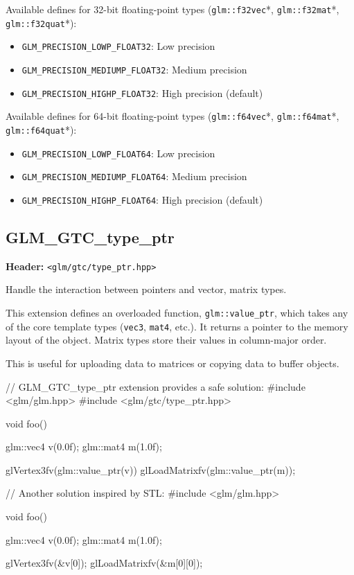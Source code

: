 \documentclass{scrartcl}
\numberwithin{figure}{subsection}
\begin{document}
Available defines for 32-bit floating-point types (\verb|glm::f32vec|*, \verb|glm::f32mat|*, \verb|glm::f32quat|*):

\begin{itemize}
    \item \verb|GLM_PRECISION_LOWP_FLOAT32|: Low precision
    \item \verb|GLM_PRECISION_MEDIUMP_FLOAT32|: Medium precision
    \item \verb|GLM_PRECISION_HIGHP_FLOAT32|: High precision (default)
\end{itemize}

Available defines for 64-bit floating-point types (\verb|glm::f64vec|*, \verb|glm::f64mat|*, \verb|glm::f64quat|*):

\begin{itemize}
    \item \verb|GLM_PRECISION_LOWP_FLOAT64|: Low precision
    \item \verb|GLM_PRECISION_MEDIUMP_FLOAT64|: Medium precision
    \item \verb|GLM_PRECISION_HIGHP_FLOAT64|: High precision (default)
\end{itemize}

\subsection{GLM\_GTC\_type\_ptr}
\textbf{Header:} \verb|<glm/gtc/type_ptr.hpp>|

Handle the interaction between pointers and vector, matrix types.

This extension defines an overloaded function, \verb|glm::value_ptr|, which takes any of the core template types (\verb|vec3|, \verb|mat4|, etc.). It returns a pointer to the memory layout of the object. Matrix types store their values in column-major order.

This is useful for uploading data to matrices or copying data to buffer objects.

\begin{cppcode}
// GLM_GTC_type_ptr extension provides a safe solution:
#include <glm/glm.hpp>
#include <glm/gtc/type_ptr.hpp>

void foo()
{
  glm::vec4 v(0.0f);
  glm::mat4 m(1.0f);

  glVertex3fv(glm::value_ptr(v)) 
  glLoadMatrixfv(glm::value_ptr(m));
}
\end{cppcode}

\begin{cppcode}
// Another solution inspired by STL:
#include <glm/glm.hpp>

void foo()
{
  glm::vec4 v(0.0f);
  glm::mat4 m(1.0f);

  glVertex3fv(&v[0]);
  glLoadMatrixfv(&m[0][0]);
}
\end{cppcode}
\end{document}
